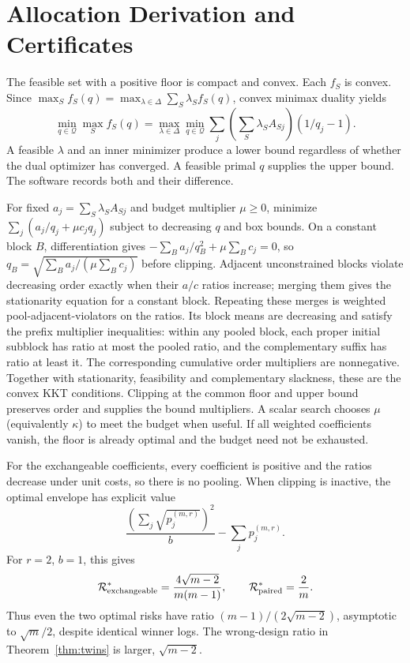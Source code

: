 \documentclass[12pt]{clear2027}
\begin{document}
\section{Allocation Derivation and Certificates}\label{app:opt}
The feasible set with a positive floor is compact and convex. Each $f_S$ is convex. Since $\max_S f_S(q)=\max_{\lambda\in\Delta}\sum_S\lambda_Sf_S(q)$, convex minimax duality yields
\[
 \min_{q\in\mathcal Q}\max_S f_S(q)
 =\max_{\lambda\in\Delta}\min_{q\in\mathcal Q}
 \sum_j\left(\sum_S\lambda_SA_{Sj}\right)(1/q_j-1).
\]
A feasible $\lambda$ and an inner minimizer produce a lower bound regardless of whether the dual optimizer has converged. A feasible primal $q$ supplies the upper bound. The software records both and their difference.

For fixed $a_j=\sum_S\lambda_SA_{Sj}$ and budget multiplier $\mu\ge0$, minimize $\sum_j(a_j/q_j+\mu c_jq_j)$ subject to decreasing $q$ and box bounds. On a constant block $B$, differentiation gives
$-\sum_B a_j/q_B^2+\mu\sum_B c_j=0$, so
$q_B=\sqrt{\sum_Ba_j/(\mu\sum_Bc_j)}$ before clipping. Adjacent unconstrained blocks violate decreasing order exactly when their $a/c$ ratios increase; merging them gives the stationarity equation for a constant block. Repeating these merges is weighted pool-adjacent-violators on the ratios. Its block means are decreasing and satisfy the prefix multiplier inequalities: within any pooled block, each proper initial subblock has ratio at most the pooled ratio, and the complementary suffix has ratio at least it. The corresponding cumulative order multipliers are nonnegative. Together with stationarity, feasibility and complementary slackness, these are the convex KKT conditions. Clipping at the common floor and upper bound preserves order and supplies the bound multipliers. A scalar search chooses $\mu$ (equivalently $\kappa$) to meet the budget when useful. If all weighted coefficients vanish, the floor is already optimal and the budget need not be exhausted.

For the exchangeable coefficients, every coefficient is positive and the ratios decrease under unit costs, so there is no pooling. When clipping is inactive, the optimal envelope has explicit value
\begin{equation}
 \frac{(\sum_j\sqrt{p_j^{(m,r)}})^2}{b}-\sum_jp_j^{(m,r)}.
\end{equation}
For $r=2$, $b=1$, this gives
\[
 \mathcal R_{\rm exchangeable}^{*}
 =\frac{4\sqrt{m-2}}{m(m-1)},\qquad
 \mathcal R_{\rm paired}^{*}=\frac2m.
\]
Thus even the two optimal risks have ratio $(m-1)/(2\sqrt{m-2})$, asymptotic to $\sqrt m/2$, despite identical winner logs. The wrong-design ratio in Theorem~\ref{thm:twins} is larger, $\sqrt{m-2}$.
\end{document}
